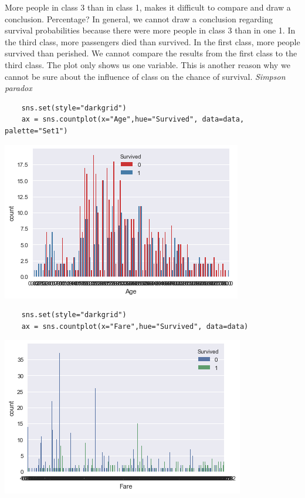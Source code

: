\documentclass[11pt]{article}
\begin{document}
More people in class 3 than in class 1, makes it difficult to compare
and draw a conclusion. Percentage? In general, we cannot draw a
conclusion regarding survival probabilities because there were more
people in class 3 than in one 1. In the third class, more passengers
died than survived. In the first class, more people survived than
perished. We cannot compare the results from the first class to the
third class. The plot only shows us one variable. This is another reason
why we cannot be sure about the influence of class on the chance of
survival. \emph{Simpson paradox}

\begin{verbatim}
    sns.set(style="darkgrid")
    ax = sns.countplot(x="Age",hue="Survived", data=data, palette="Set1")
\end{verbatim}

\begin{center}
\includegraphics[width=.9\linewidth]{output_66_0.png}
\end{center}

\begin{verbatim}
    sns.set(style="darkgrid")
    ax = sns.countplot(x="Fare",hue="Survived", data=data)
\end{verbatim}

\begin{center}
\includegraphics[width=.9\linewidth]{output_67_0.png}
\end{center}
\end{document}
